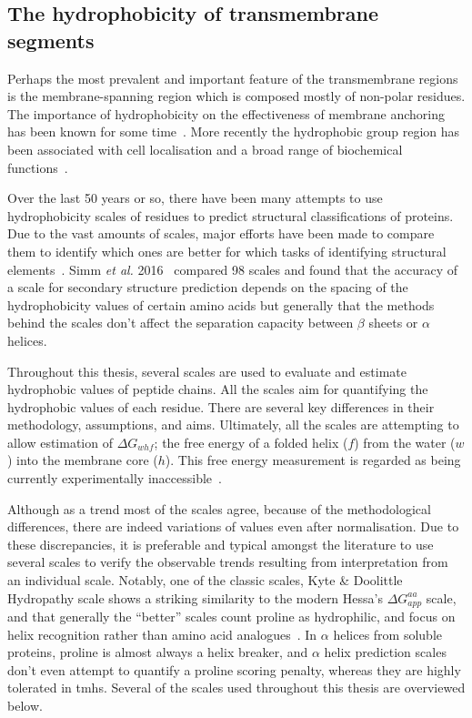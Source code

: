 \subsection{The hydrophobicity of transmembrane segments}\label{section:hydrophobicityscales}

Perhaps the most prevalent and important feature of the transmembrane regions is the membrane\--spanning region which is composed mostly of non-polar residues.
The importance of hydrophobicity on the effectiveness of membrane anchoring has been known for some time~\cite{Davis1985}.
More recently the hydrophobic group region has been associated with cell localisation and a broad range of biochemical functions~\cite{Junne2010, Sharpe2010, Wong2012}.

Over the last 50 years or so, there have been many attempts to use hydrophobicity scales of residues to predict structural classifications of proteins.
Due to the vast amounts of scales, major efforts have been made to compare them to identify which ones are better for which tasks of identifying structural elements~\cite{Simm2016, Peters2014}.
Simm \textit{ et al.} 2016~\cite{Simm2016} compared 98 scales and found that the accuracy of a scale for secondary structure prediction depends on the spacing of the hydrophobicity values of certain amino acids but generally that the methods behind the scales don't affect the separation capacity between $ \beta $ sheets or $ \alpha $ helices.

Throughout this thesis, several scales are used to evaluate and estimate hydrophobic values of peptide chains.
All the scales aim for quantifying the hydrophobic values of each residue.
There are several key differences in their methodology, assumptions, and aims.
Ultimately, all the scales are attempting to allow estimation of ${\Delta G}_{whf}$; the free energy of a folded helix ($ f $) from the water ($w$) into the membrane core ($h$).
This free energy measurement is regarded as being currently experimentally inaccessible~\cite{Cymer2015}.

Although as a trend most of the scales agree, because of the methodological differences, there are indeed variations of values even after normalisation.
Due to these discrepancies, it is preferable and typical amongst the literature to use several scales to verify the observable trends resulting from interpretation from an individual scale.
Notably, one of the classic scales, Kyte \& Doolittle Hydropathy scale shows a striking similarity to the modern Hessa's ${\Delta G}_{app}^{aa}$ scale, and that generally the ``better'' scales count proline as hydrophilic, and focus on helix recognition rather than amino acid analogues~\cite{Peters2014}.
In $\alpha$ helices from soluble proteins, proline is almost always a helix breaker, and $\alpha$ helix prediction scales don't even attempt to quantify a proline scoring penalty, whereas they are highly tolerated in \gls{tmh}s.
Several of the scales used throughout this thesis are overviewed below.

